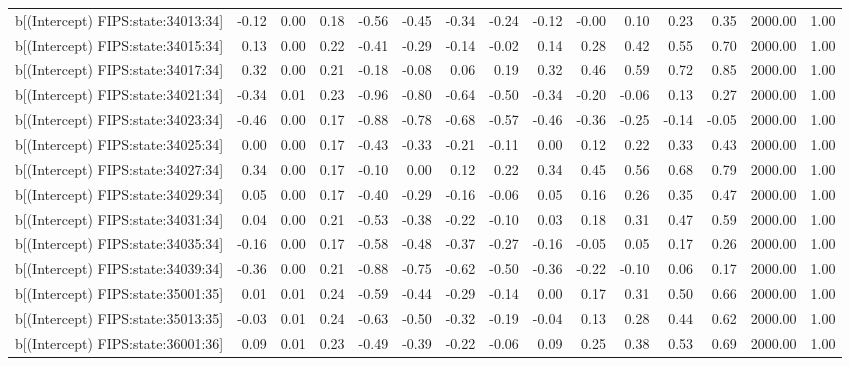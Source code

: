 \begin{table}[ht]
\begin{tabular}{rrrrrrrrrrrrrrr}
  b[(Intercept) FIPS:state:34013:34] & -0.12 & 0.00 & 0.18 & -0.56 & -0.45 & -0.34 & -0.24 & -0.12 & -0.00 & 0.10 & 0.23 & 0.35 & 2000.00 & 1.00 \\ 
  b[(Intercept) FIPS:state:34015:34] & 0.13 & 0.00 & 0.22 & -0.41 & -0.29 & -0.14 & -0.02 & 0.14 & 0.28 & 0.42 & 0.55 & 0.70 & 2000.00 & 1.00 \\ 
  b[(Intercept) FIPS:state:34017:34] & 0.32 & 0.00 & 0.21 & -0.18 & -0.08 & 0.06 & 0.19 & 0.32 & 0.46 & 0.59 & 0.72 & 0.85 & 2000.00 & 1.00 \\ 
  b[(Intercept) FIPS:state:34021:34] & -0.34 & 0.01 & 0.23 & -0.96 & -0.80 & -0.64 & -0.50 & -0.34 & -0.20 & -0.06 & 0.13 & 0.27 & 2000.00 & 1.00 \\ 
  b[(Intercept) FIPS:state:34023:34] & -0.46 & 0.00 & 0.17 & -0.88 & -0.78 & -0.68 & -0.57 & -0.46 & -0.36 & -0.25 & -0.14 & -0.05 & 2000.00 & 1.00 \\ 
  b[(Intercept) FIPS:state:34025:34] & 0.00 & 0.00 & 0.17 & -0.43 & -0.33 & -0.21 & -0.11 & 0.00 & 0.12 & 0.22 & 0.33 & 0.43 & 2000.00 & 1.00 \\ 
  b[(Intercept) FIPS:state:34027:34] & 0.34 & 0.00 & 0.17 & -0.10 & 0.00 & 0.12 & 0.22 & 0.34 & 0.45 & 0.56 & 0.68 & 0.79 & 2000.00 & 1.00 \\ 
  b[(Intercept) FIPS:state:34029:34] & 0.05 & 0.00 & 0.17 & -0.40 & -0.29 & -0.16 & -0.06 & 0.05 & 0.16 & 0.26 & 0.35 & 0.47 & 2000.00 & 1.00 \\ 
  b[(Intercept) FIPS:state:34031:34] & 0.04 & 0.00 & 0.21 & -0.53 & -0.38 & -0.22 & -0.10 & 0.03 & 0.18 & 0.31 & 0.47 & 0.59 & 2000.00 & 1.00 \\ 
  b[(Intercept) FIPS:state:34035:34] & -0.16 & 0.00 & 0.17 & -0.58 & -0.48 & -0.37 & -0.27 & -0.16 & -0.05 & 0.05 & 0.17 & 0.26 & 2000.00 & 1.00 \\ 
  b[(Intercept) FIPS:state:34039:34] & -0.36 & 0.00 & 0.21 & -0.88 & -0.75 & -0.62 & -0.50 & -0.36 & -0.22 & -0.10 & 0.06 & 0.17 & 2000.00 & 1.00 \\ 
  b[(Intercept) FIPS:state:35001:35] & 0.01 & 0.01 & 0.24 & -0.59 & -0.44 & -0.29 & -0.14 & 0.00 & 0.17 & 0.31 & 0.50 & 0.66 & 2000.00 & 1.00 \\ 
  b[(Intercept) FIPS:state:35013:35] & -0.03 & 0.01 & 0.24 & -0.63 & -0.50 & -0.32 & -0.19 & -0.04 & 0.13 & 0.28 & 0.44 & 0.62 & 2000.00 & 1.00 \\ 
  b[(Intercept) FIPS:state:36001:36] & 0.09 & 0.01 & 0.23 & -0.49 & -0.39 & -0.22 & -0.06 & 0.09 & 0.25 & 0.38 & 0.53 & 0.69 & 2000.00 & 1.00 \\ 

\end{tabular}
\end{table}
